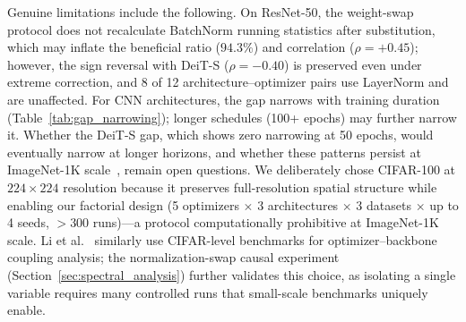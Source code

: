 Genuine limitations include the following.
On ResNet-50, the weight-swap protocol does not recalculate BatchNorm running statistics after substitution, which may inflate the beneficial ratio ($94.3\%$) and correlation ($\rho{=}{+}0.45$); however, the sign reversal with DeiT-S ($\rho{=}{-}0.40$) is preserved even under extreme correction, and 8 of 12 architecture--optimizer pairs use LayerNorm and are unaffected.
For CNN architectures, the gap narrows with training duration (Table~\ref{tab:gap_narrowing}); longer schedules (100+ epochs) may further narrow it.
Whether the DeiT-S gap, which shows zero narrowing at 50 epochs, would eventually narrow at longer horizons, and whether these patterns persist at ImageNet-1K scale~\cite{kumar2024how}, remain open questions.
We deliberately chose CIFAR-100 at $224{\times}224$ resolution because it preserves full-resolution spatial structure while enabling our factorial design (5 optimizers $\times$ 3 architectures $\times$ 3 datasets $\times$ up to 4 seeds, $>$300 runs)---a protocol computationally prohibitive at ImageNet-1K scale.
Li et al.~\cite{li2024bocb} similarly use CIFAR-level benchmarks for optimizer--backbone coupling analysis; the normalization-swap causal experiment (Section~\ref{sec:spectral_analysis}) further validates this choice, as isolating a single variable requires many controlled runs that small-scale benchmarks uniquely enable.
